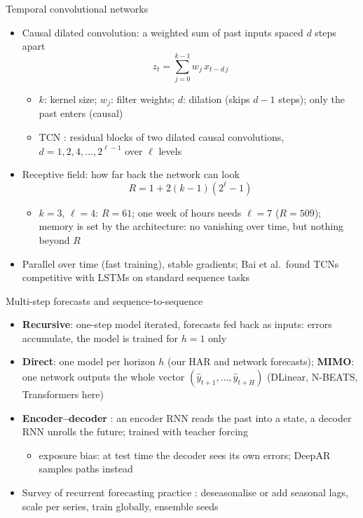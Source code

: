 \begin{frame}{Temporal convolutional networks}
\itemsize{\small}
\begin{itemize}
    \item Causal dilated convolution: a weighted sum of past inputs spaced $d$ steps apart 
    \[ z_t = \sum_{j=0}^{k-1} w_j\,x_{t - d\,j} \]
    \begin{itemize}
        \item $k$: kernel size; $w_j$: filter weights; $d$: dilation (skips $d - 1$ steps); only the past enters (causal)
        \item TCN : residual blocks of two dilated causal convolutions, $d = 1, 2, 4, \dots, 2^{\ell-1}$ over $\ell$ levels
    \end{itemize}
    \item Receptive field: how far back the network can look
    \[ R = 1 + 2(k - 1)(2^\ell - 1) \]
    \begin{itemize}
        \item $k = 3$, $\ell = 4$: $R = 61$; one week of hours needs $\ell = 7$ ($R = 509$); memory is set by the architecture: no vanishing over time, but nothing beyond $R$
    \end{itemize}
    \item Parallel over time (fast training), stable gradients; Bai et al.\ found TCNs competitive with LSTMs on standard sequence tasks
\end{itemize}
\end{frame}

\begin{frame}{Multi-step forecasts and sequence-to-sequence}
\itemsize{\small}
\begin{itemize}
    \item \textbf{Recursive}: one-step model iterated, forecasts fed back as inputs: errors accumulate, the model is trained for $h = 1$ only
    \item \textbf{Direct}: one model per horizon $h$ (our HAR and network forecasts); \textbf{MIMO}: one network outputs the whole vector $(\hat y_{t+1},\dots,\hat y_{t+H})$ (DLinear, N-BEATS, Transformers here)
    \item \textbf{Encoder--decoder} : an encoder RNN reads the past into a state, a decoder RNN unrolls the future; trained with teacher forcing
    \begin{itemize}
        \item exposure bias: at test time the decoder sees its own errors; DeepAR samples paths instead
    \end{itemize}
    \item Survey of recurrent forecasting practice : deseasonalise or add seasonal lags, scale per series, train globally, ensemble seeds
\end{itemize}
\end{frame}

